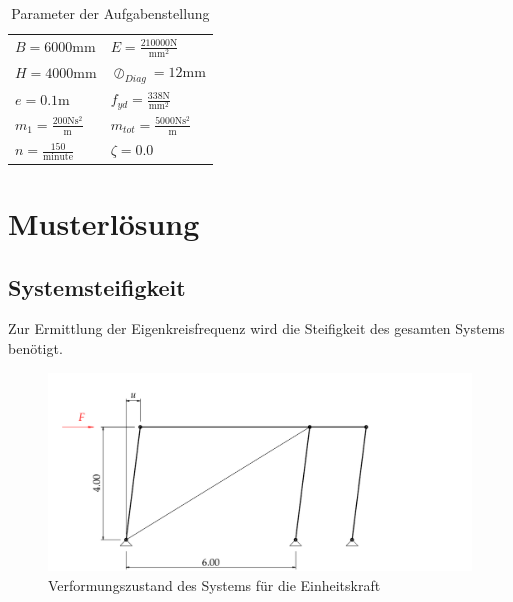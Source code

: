 \documentclass[
  letterpaper,
  DIV=11]{scrreprt}
\begin{document}
\hypertarget{tbl-parameter_gesamt}{}
\begin{longtable}[]{@{}
  >{\raggedright\arraybackslash}p{}
  >{\raggedright\arraybackslash}p{}@{}}
\caption{\label{tbl-parameter_gesamt}Parameter der
Aufgabenstellung}\tabularnewline
\toprule\noalign{}
\endfirsthead
\endhead
\bottomrule\noalign{}
\endlastfoot
\(B = 6000 \text{mm}\) &
\(E = \frac{210000 \text{N}}{\text{mm}^{2}}\) \\
\(H = 4000 \text{mm}\) & \(\oslash_{Diag} = 12 \text{mm}\) \\
\(e = 0.1 \text{m}\) &
\(f_{yd} = \frac{338 \text{N}}{\text{mm}^{2}}\) \\
\(m_{1} = \frac{200 \text{N} \text{s}^{2}}{\text{m}}\) &
\(m_{tot} = \frac{5000 \text{N} \text{s}^{2}}{\text{m}}\) \\
\(n = \frac{150}{\text{minute}}\) & \(\zeta = 0.0\) \\
\end{longtable}

\newpage{}

\hypertarget{musterluxf6sung-4}{%
\section{Musterlösung}\label{musterluxf6sung-4}}

\hypertarget{systemsteifigkeit}{%
\subsection{Systemsteifigkeit}\label{systemsteifigkeit}}

Zur Ermittlung der Eigenkreisfrequenz wird die Steifigkeit des gesamten
Systems benötigt.

\begin{figure}[H]

{\centering \includegraphics{index_files/mediabag/bilder/aufgabe_ems_ge_verformung.pdf}

}

\caption{\label{fig-ems_ges_verform_FW}Verformungszustand des Systems
für die Einheitskraft}

\end{figure}
\end{document}

